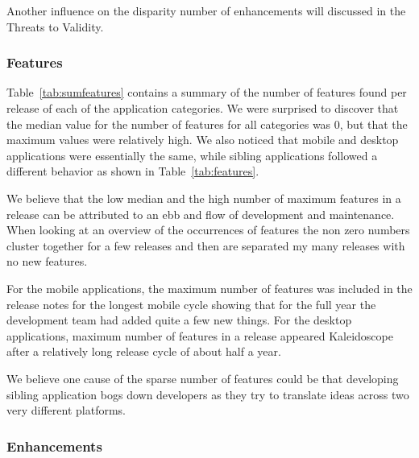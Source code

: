 \documentclass{acm_proc_article-sp}
\begin{document}
Another influence on the disparity number of enhancements will discussed in the Threats to Validity.

\subsubsection{Features}

\begin{center}

\label{tab:sumfeatures}
\end{center}

\begin{center}

\label{tab:features}
\end{center}

Table~\ref{tab:sumfeatures} contains a summary of the number of features found per release of each of the application categories. 
We were surprised to discover that the median value for the number of features for all categories was 0, but that the maximum values were relatively high.
We also noticed that mobile and desktop applications were essentially the same, while sibling applications followed a different behavior as shown in Table~\ref{tab:features}.

We believe that the low median and the high number of maximum features in a release can be attributed to an ebb and flow of development and maintenance. 
When looking at an overview of the occurrences of features the non zero numbers cluster together for a few releases and then are separated my many releases with no new features.

For the mobile applications, the maximum number of features was included in the release notes for the longest mobile cycle showing that for the full year the development team had added quite a few new things. 
For the desktop applications, maximum number of features in a release appeared Kaleidoscope after a relatively long release cycle of about half a year.

We believe one cause of the sparse number of features could be that developing sibling application bogs down developers as they try to translate ideas across two very different platforms. 


\subsubsection{Enhancements}

\begin{center}

\label{tab:sumenhance}
\end{center}
\end{document}
